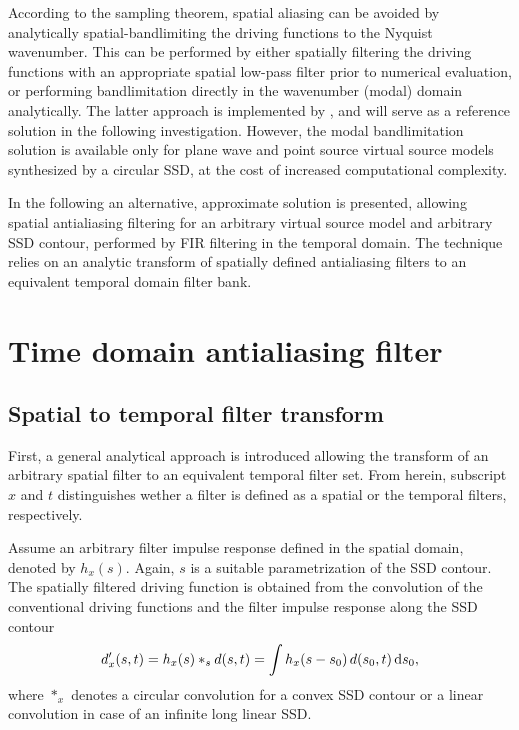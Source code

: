 \documentclass[conference]{IEEEtran}
\begin{document}
According to the sampling theorem, spatial aliasing can be avoided by analytically spatial-bandlimiting the driving functions to the Nyquist wavenumber.
This can be performed by either spatially filtering the driving functions with an appropriate spatial low-pass filter prior to numerical evaluation, or performing bandlimitation directly in the wavenumber (modal) domain analytically.
The latter approach is implemented by \cite{Nara and Fiete}, and will serve as a reference solution in the following investigation.
However, the modal bandlimitation solution is available only for plane wave and point source virtual source models synthesized by a circular SSD, at the cost of increased computational complexity.

In the following an alternative, approximate solution is presented, allowing spatial antialiasing filtering for an arbitrary virtual source model and arbitrary SSD contour, performed by FIR filtering in the temporal domain.
The technique relies on an analytic transform of spatially defined antialiasing filters to an equivalent temporal domain filter bank.

\section{Time domain antialiasing filter}

\subsection{Spatial to temporal filter transform}
First, a general analytical approach is introduced allowing the transform of an arbitrary spatial filter to an equivalent temporal filter set.
From herein, subscript $x$ and $t$ distinguishes wether a filter is defined as a spatial or the temporal filters, respectively.

Assume an arbitrary filter impulse response defined in the spatial domain, denoted by $h_x(s)$.
Again, $s$ is a suitable parametrization of the SSD contour.
The spatially filtered driving function is obtained from the convolution of the conventional driving functions and the filter impulse response along the SSD contour
\begin{equation}
    d'_x(s,t) = h_x(s) \ast_s d(s,t) = \int h_x(s-s_0) \, d(s_0,t) \, \td s_0,
    \label{eq:spatial_conv}
\end{equation}
where $\ast_x$ denotes a circular convolution for a convex SSD contour or a linear convolution in case of an infinite long linear SSD.
\end{document}
